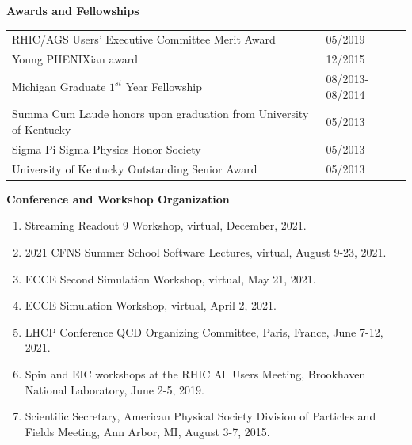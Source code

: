 \documentclass[11pt]{article}
\begin{document}

\vspace{7pt}
\begin{flushleft}
	\LARGE\textbf{Awards and Fellowships} \\
	\normalsize
	
	\begin{tabular}{ll}
		
		RHIC/AGS Users' Executive Committee Merit Award & 05/2019\\
		Young PHENIXian award & 12/2015\\
		Michigan Graduate $1^{st}$ Year Fellowship & 08/2013-08/2014 \\
		Summa Cum Laude honors upon graduation from University of Kentucky & 05/2013 \\
		Sigma Pi Sigma Physics Honor Society & 05/2013 \\
		University of Kentucky Outstanding Senior Award & 05/2013\\
	\end{tabular}
\end{flushleft}





\newpage






\vspace{7pt}
\begin{flushleft}
	\LARGE\textbf{Conference and Workshop Organization} \\
	\normalsize 
	\begin{enumerate}
	
		\item Streaming Readout 9 Workshop, virtual, December, 2021.
		\item 2021 CFNS Summer School Software Lectures, virtual, August 9-23, 2021.
		\item ECCE Second Simulation Workshop, virtual, May 21, 2021.
		\item ECCE Simulation Workshop, virtual, April 2, 2021.
		\item LHCP Conference QCD Organizing Committee, Paris, France, June 7-12, 2021.
		\item Spin and EIC workshops at the RHIC All Users Meeting, Brookhaven National Laboratory, June 2-5, 2019.
		\item Scientific Secretary, American Physical Society Division of Particles and Fields Meeting, Ann Arbor, MI, August 3-7, 2015.
	\end{enumerate}
\end{flushleft}
\end{document}
